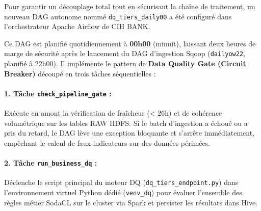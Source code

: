 Pour garantir un découplage total tout en sécurisant la chaîne de traitement, un nouveau DAG autonome nommé \texttt{dq\_tiers\_daily00} a été configuré dans l'orchestrateur Apache Airflow de CIH BANK. 

Ce DAG est planifié quotidiennement à \textbf{00h00} (minuit), laissant deux heures de marge de sécurité après le lancement du DAG d'ingestion Sqoop (\texttt{dailyow22}, planifié à 22h00). Il implémente le pattern de \textbf{Data Quality Gate (Circuit Breaker)} découpé en trois tâches séquentielles :

\paragraph{1. Tâche \texttt{check\_pipeline\_gate} :} Exécute en amont la vérification de fraîcheur (< 26h) et de cohérence volumétrique sur les tables RAW HDFS. Si le batch d'ingestion a échoué ou a pris du retard, le DAG lève une exception bloquante et s'arrête immédiatement, empêchant le calcul de faux indicateurs sur des données périmées.

\paragraph{2. Tâche \texttt{run\_business\_dq} :} Déclenche le script principal du moteur DQ (\texttt{dq\_tiers\_endpoint.py}) dans l'environnement virtuel Python dédié (\texttt{venv\_dq}) pour évaluer l'ensemble des règles métier SodaCL sur le cluster via Spark et persister les résultats dans Hive.

